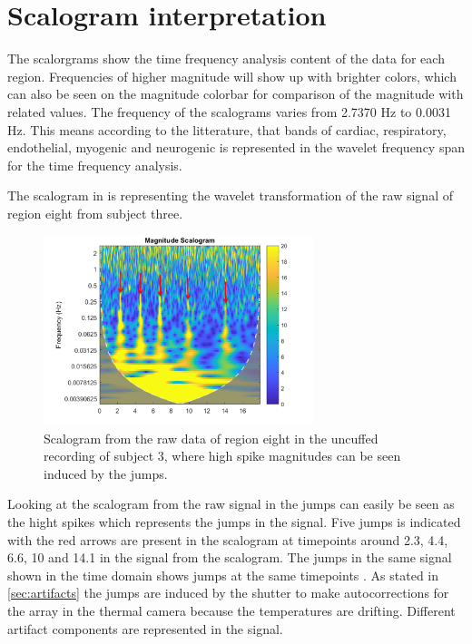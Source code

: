 \section{Scalogram interpretation}

The scalorgrams show the time frequency analysis content of the data for each region. Frequencies of higher magnitude will show up with brighter colors, which can also be seen on the magnitude colorbar for comparison of the magnitude with related values.
The frequency of the scalograms varies from 2.7370 Hz to 0.0031 Hz. This means according to the litterature, that bands of cardiac, respiratory, endothelial, myogenic and neurogenic is represented in the wavelet frequency span for the time frequency analysis. \cite{grayer2004}

The scalogram in  is representing the wavelet transformation of the raw signal of region eight from subject three.

\begin{figure}[H]
	\includegraphics[width=0.7\textwidth]{figures/uncuffed_sub3_roi8_uncorr}
	\caption{Scalogram from the raw data of region eight in the uncuffed recording of subject 3, where high spike magnitudes can be seen induced by the jumps.}
	\label{fig:scalogram_uncorr}
\end{figure}

Looking at the scalogram from the raw signal in  the jumps can easily be seen as the hight spikes which represents the jumps in the signal. Five jumps is indicated with the red arrows are present in the scalogram at timepoints around 2.3, 4.4, 6.6, 10 and 14.1 in the 
signal from the scalogram. The jumps in the same signal shown in the time domain shows jumps at the same timepoints  . As stated in \ref{sec:artifacts} the jumps are induced by the shutter to make autocorrections for the array in the thermal camera because the temperatures are drifting. Different artifact components are represented in the signal. 

